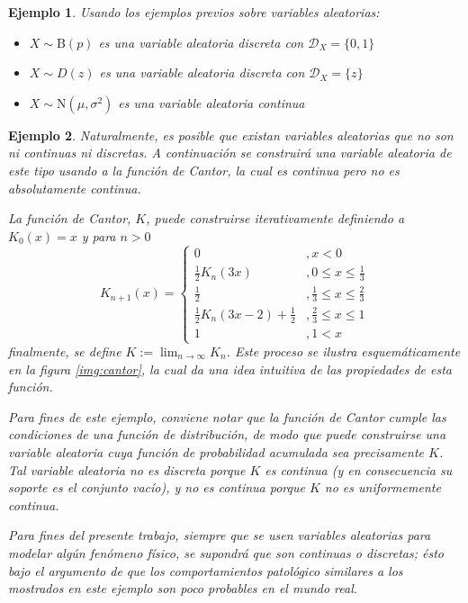 \documentclass[12pt,letterpaper,draft]{book}
\newtheorem{ejemplo}{Ejemplo}[chapter]
\begin{document}
\begin{ejemplo}
Usando los ejemplos previos sobre variables aleatorias:
\begin{itemize}
\item $X\sim \text{B}(p)$ es una variable aleatoria discreta con $\mathcal{D}_X = \{0,1\}$
\item $X\sim D(z)$ es una variable aleatoria discreta con $\mathcal{D}_X = \{z\}$
\item $X\sim \text{N}(\mu,\sigma^{2})$ es una variable aleatoria continua
\end{itemize}
\end{ejemplo}

\begin{ejemplo}
Naturalmente, es posible que existan variables aleatorias que no son ni continuas ni discretas.
%
A continuación se construirá una variable aleatoria de este tipo usando a la función de Cantor, la cual es continua pero no es absolutamente continua.

La función de Cantor, $K$, puede construirse iterativamente definiendo a $K_0(x) = x$ y para $n>0$
\begin{equation}
K_{n+1}(x) =
\begin{cases}
0 &, x < 0 \\
\frac{1}{2} K_n(3 x) &, 0\leq x \leq \frac{1}{3} \\
\frac{1}{2} &, \frac{1}{3} \leq x \leq \frac{2}{3} \\
\frac{1}{2} K_n(3 x-2) + \frac{1}{2} &, \frac{2}{3}\leq x \leq 1 \\
1 &, 1 < x
\end{cases}
\end{equation}
finalmente, se define $K := \lim_{n\rightarrow \infty} K_n$. Este proceso se ilustra esquemáticamente en la figura \ref{img:cantor}, la cual da una idea intuitiva de las propiedades de esta función.

Para fines de este ejemplo, conviene notar que la función de Cantor cumple las condiciones de una función de distribución, de modo que puede construirse una variable aleatoria cuya función de probabilidad acumulada sea precisamente $K$.
%
Tal variable aleatoria no es discreta porque $K$ es continua (y en consecuencia su soporte es el conjunto vacío), y no es continua porque $K$ no es uniformemente continua.

Para fines del presente trabajo, siempre que se usen variables aleatorias para modelar algún fenómeno físico, se supondrá que son continuas o discretas; ésto bajo el argumento de que los comportamientos \textit{patológico} similares a los mostrados en este ejemplo son poco probables en el mundo real.
\end{ejemplo}
\end{document}
